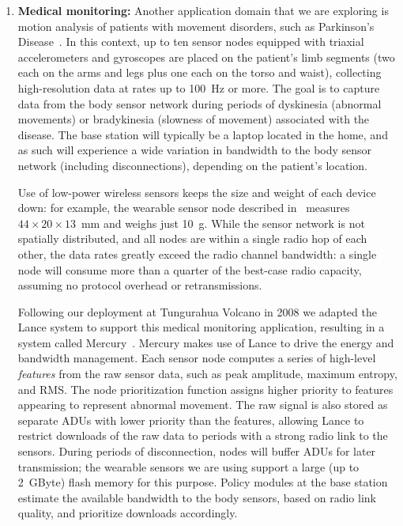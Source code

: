 \begin{enumerate}
\item \textbf{Medical monitoring:} Another application domain that we are
exploring is motion analysis of patients with movement disorders, such as
Parkinson's Disease~\cite{parkinsons-embs07}. In this context, up to ten
sensor nodes equipped with triaxial accelerometers and gyroscopes are placed
on the patient's limb segments (two each on the arms and legs plus one each
on the torso and waist), collecting high-resolution data at rates up to
100~Hz or more. The goal is to capture data from the body sensor network
during periods of dyskinesia (abnormal movements) or bradykinesia (slowness
of movement) associated with the disease. The base station will typically be
a laptop located in the home, and as such will experience a wide variation in
bandwidth to the body sensor network (including disconnections), depending on
the patient's location.

Use of low-power wireless sensors keeps the size and weight of each device
down: for example, the wearable sensor node described
in~\cite{parkinsons-embs07} measures $44 \times 20 \times 13$~mm and weighs
just 10~g. While the sensor network is not spatially distributed, and all
nodes are within a single radio hop of each other, the data rates greatly
exceed the radio channel bandwidth: a single node will consume more than a
quarter of the best-case radio capacity, assuming no protocol overhead or
retransmissions.

Following our deployment at Tungurahua Volcano in 2008 we adapted the Lance
system to support this medical monitoring application, resulting in a system
called Mercury~\cite{mercury-sensys09}. Mercury makes use of Lance to drive
the energy and bandwidth management. Each sensor node computes a series of
high-level \textit{features} from the raw sensor data, such as peak
amplitude, maximum entropy, and RMS. The node prioritization function assigns
higher priority to features appearing to represent abnormal movement. The raw
signal is also stored as separate ADUs with lower priority than the features,
allowing Lance to restrict downloads of the raw data to periods with a strong
radio link to the sensors. During periods of disconnection, nodes will buffer
ADUs for later transmission; the wearable sensors we are using support a
large (up to 2~GByte) flash memory for this purpose. Policy modules at the
base station estimate the available bandwidth to the body sensors, based on
radio link quality, and prioritize downloads accordingly.

\end{enumerate}
